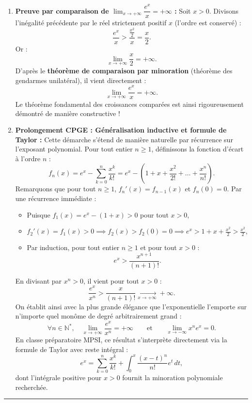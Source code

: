 \documentclass[11pt,a4paper]{article}
\newcommand{\N}{\mathbb{N}}
\begin{document}
\begin{correctionbox}[Exercice 12]
\begin{enumerate}[label=\textbf{\arabic*.}]
    \item \textbf{Preuve par comparaison de $\lim_{x \to +\infty} \dfrac{e^x}{x} = +\infty$ :}
    Soit $x > 0$. Divisons l'inégalité précédente par le réel strictement positif $x$ (l'ordre est conservé) :
    \[
    \frac{e^x}{x} > \frac{\frac{x^2}{2}}{x} = \frac{x}{2}.
    \]
    Or :
    \[
    \lim_{x \to +\infty} \frac{x}{2} = +\infty.
    \]
    D'après le \textbf{théorème de comparaison par minoration} (théorème des gendarmes unilatéral), il vient directement :
    \[
    \boxed{\lim_{x \to +\infty} \frac{e^x}{x} = +\infty}.
    \]
    Le théorème fondamental des croissances comparées est ainsi rigoureusement démontré de manière constructive !

    \item \textbf{Prolongement CPGE : Généralisation inductive et formule de Taylor :}
    Cette démarche s'étend de manière naturelle par récurrence sur l'exposant polynomial.
    Pour tout entier $n \ge 1$, définissons la fonction d'écart à l'ordre $n$ :
    \[
    f_n(x) = e^x - \sum_{k=0}^{n} \frac{x^k}{k!} = e^x - \left(1 + x + \frac{x^2}{2!} + \dots + \frac{x^n}{n!}\right).
    \]
    Remarquons que pour tout $n \ge 1$, $f_n'(x) = f_{n-1}(x)$ et $f_n(0) = 0$.
    Par une récurrence immédiate :
    \begin{itemize}
        \item Puisque $f_1(x) = e^x - (1+x) > 0$ pour tout $x > 0$,
        \item $f_2'(x) = f_1(x) > 0 \implies f_2(x) > f_2(0) = 0 \implies e^x > 1 + x + \frac{x^2}{2} > \frac{x^2}{2}$,
        \item Par induction, pour tout entier $n \ge 1$ et pour tout $x > 0$ :
        \[
        e^x > \frac{x^{n+1}}{(n+1)!}.
        \]
    \end{itemize}
    En divisant par $x^n > 0$, il vient pour tout $x > 0$ :
    \[
    \frac{e^x}{x^n} > \frac{x}{(n+1)!} \xrightarrow[x \to +\infty]{} +\infty.
    \]
    On établit ainsi avec la plus grande élégance que l'exponentielle l'emporte sur n'importe quel monôme de degré arbitrairement grand :
    \[
    \forall n \in \N^*, \quad \lim_{x \to +\infty} \frac{e^x}{x^n} = +\infty \qquad \text{et} \qquad \lim_{x \to -\infty} x^n e^x = 0.
    \]
    En classe préparatoire MPSI, ce résultat s'interprète directement via la formule de Taylor avec reste intégral :
    \[
    e^x = \sum_{k=0}^n \frac{x^k}{k!} + \int_0^x \frac{(x-t)^n}{n!} e^t \, dt,
    \]
    dont l'intégrale positive pour $x > 0$ fournit la minoration polynomiale recherchée.
\end{enumerate}
\end{correctionbox}

\vspace{0.8cm}
\hrule
\vspace{0.8cm}
\end{document}
